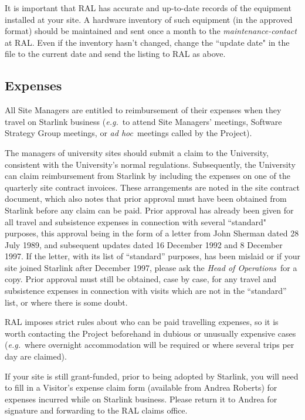 It is important that RAL has accurate and up-to-date records of the equipment
installed at your site.
A hardware inventory of such equipment (in the approved format) should be
maintained and sent once a month to the {\em maintenance-contact}\, at RAL.
Even if the inventory hasn't changed, change the ``update date" in the file to
the current date and send the listing to RAL as above.

\subsection{Expenses}

All Site Managers are entitled to reimbursement of their expenses when
they travel on Starlink business ({\em e.g.}\, to attend Site Managers'
meetings, Software Strategy Group meetings, or {\em ad hoc}\, meetings called
by the Project).

The managers of university sites should submit a claim to the University,
consistent with the University's normal regulations.
Subsequently, the University can claim reimbursement from Starlink by
including the expenses on one of the quarterly site contract invoices.
These arrangements are noted in the site contract document, which also notes
that prior approval must have been obtained from Starlink before any claim can
be paid.
Prior approval has already been given for all travel and subsistence expenses
in connection with several ``standard" purposes, this approval being in
the form of a letter from John Sherman dated 28 July 1989, and subsequent
updates dated 16 December 1992 and 8 December 1997.
If the letter, with its list of ``standard'' purposes, has been mislaid or
if your site joined Starlink after December 1997, please ask the
{\em Head of Operations}\, for a copy.
Prior approval must still be obtained, case by case, for any travel and
subsistence expenses in connection with visits which are not in the
``standard'' list, or where there is some doubt.

RAL imposes strict rules about who can be paid travelling expenses, so it is
worth contacting the Project beforehand in dubious or unusually expensive cases
({\em e.g.}\, where overnight accommodation will be required or where several trips
per day are claimed).

If your site is still grant-funded, prior to being adopted by Starlink, you
will need to fill in a Visitor's expense claim form (available from Andrea
Roberts) for expenses incurred while on Starlink business.
Please return it to Andrea for signature and forwarding to the RAL claims
office.

